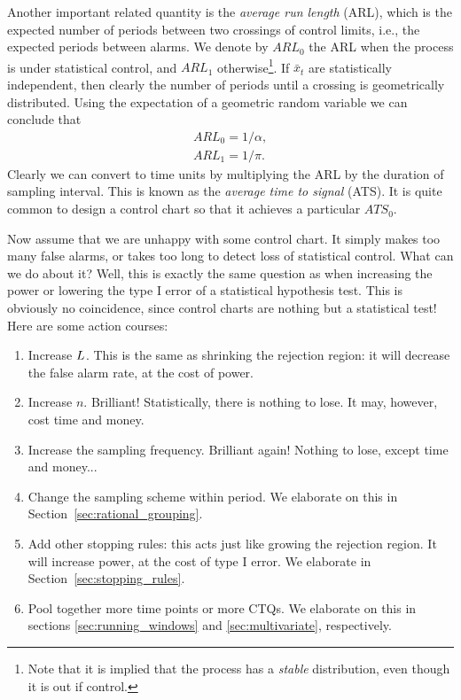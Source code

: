 Another important related quantity is the \emph{average run length} (ARL), which is the expected number of periods between two crossings of control limits, i.e., the expected periods between alarms. 
We denote by $ARL_0$ the ARL when the process is under statistical control, and $ARL_1$ otherwise\footnote{Note that it is implied that the process has a \emph{stable} distribution, even though it is out if control.}. 
If $\bar{x}_t$ are statistically independent, then clearly the number of periods until a crossing is geometrically distributed. Using the expectation of a geometric random variable we can conclude that 
\begin{align}
	ARL_0=1/\alpha \label{eq:arl_0}, \\
	ARL_1=1/\pi \label{eq:arl_1}.
\end{align}
Clearly we can convert to time units by multiplying the ARL by the duration of sampling interval.
This is known as the \emph{average time to signal} (ATS).
It is quite common to design a control chart so that it achieves a particular $ATS_0$.


Now assume that we are unhappy with some control chart. 
It simply makes too many false alarms, or takes too long to detect loss of statistical control.
What can we do about it?
Well, this is exactly the same question as when increasing the power or lowering the type I error of a statistical hypothesis test. This is obviously no coincidence, since control charts are nothing but a statistical test!
Here are some action courses:
\begin{enumerate}
\item Increase $L$. This is the same as shrinking the rejection region: 
it will decrease the false alarm rate, at the cost of power.
\item Increase $n$. Brilliant! Statistically, there is nothing to lose. It may, however, cost time and money.
\item Increase the sampling frequency. Brilliant again! Nothing to lose, except time and money...
\item Change the sampling scheme within period. We elaborate on this in Section~\ref{sec:rational_grouping}.
\item Add other stopping rules: 
this acts just like growing the rejection region. It will increase power, at the cost of type I error. We elaborate in Section~\ref{sec:stopping_rules}.
\item Pool together more time points or more CTQs. We elaborate on this in sections \ref{sec:running_windows} and  \ref{sec:multivariate}, respectively. 
\end{enumerate}






